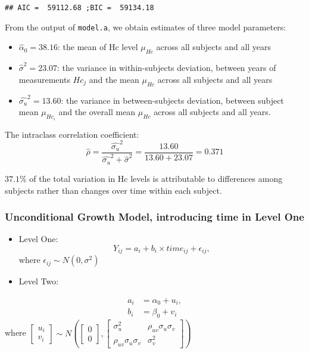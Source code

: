 \documentclass[
]{article}
\providecommand{\tightlist}{%
  \setlength{\itemsep}{0pt}\setlength{\parskip}{0pt}}
\begin{document}
\begin{verbatim}
## AIC =  59112.68 ;BIC =  59134.18
\end{verbatim}

From the output of \texttt{model.a}, we obtain estimates of three model
parameters:

\begin{itemize}
\tightlist
\item
  \(\hat{\alpha}_0 = 38.16\): the mean of Hc level \(\mu_{Hc}\) across
  all subjects and all years
\item
  \(\hat{\sigma}^2 = 23.07\): the variance in within-subjects deviation,
  between years of measurements \(Hc_j\) and the mean \(\mu_{Hc}\)
  across all subjects and all years
\item
  \(\hat{\sigma_u}^2 = 13.60\): the variance in between-subjects
  deviation, between subject mean \(\mu_{Hc_i}\) and the overall mean
  \(\mu_{Hc}\) across all subjects and all years.
\end{itemize}

The intraclass correlation coefficient:
\[\hat{\rho}= \frac{\hat{\sigma_u}^2}{\hat{\sigma_u}^2+\hat{\sigma}^2} = \frac{13.60}{13.60+ 23.07}=0.371\]

\(37.1\%\) of the total variation in Hc levels is attributable to
differences among subjects rather than changes over time within each
subject.

\hypertarget{unconditional-growth-model-introducing-time-in-level-one}{%
\subsubsection{Unconditional Growth Model, introducing time in Level
One}\label{unconditional-growth-model-introducing-time-in-level-one}}

\begin{itemize}
\item
  Level One: \[Y_{ij} = a_i + b_i \times time_{ij} + \epsilon_{ij},\]
  where \(\epsilon_{ij} \sim N(0,\sigma^2)\)
\item
  Level Two:
\end{itemize}

\begin{align}
  a_i &= \alpha_0 + u_i, \\
  b_i &= \beta_0 + v_i
  \end{align} where
\(\begin{bmatrix} u_i \\ v_i \end{bmatrix} \sim N\left(\begin{bmatrix} 0 \\ 0 \end{bmatrix}, \begin{bmatrix}\sigma_{u}^2 & \rho_{uv}\sigma_u\sigma_v \\ \rho_{uv} \sigma_u\sigma_v & \sigma_v^2 \end{bmatrix}\right)\)
\end{document}
